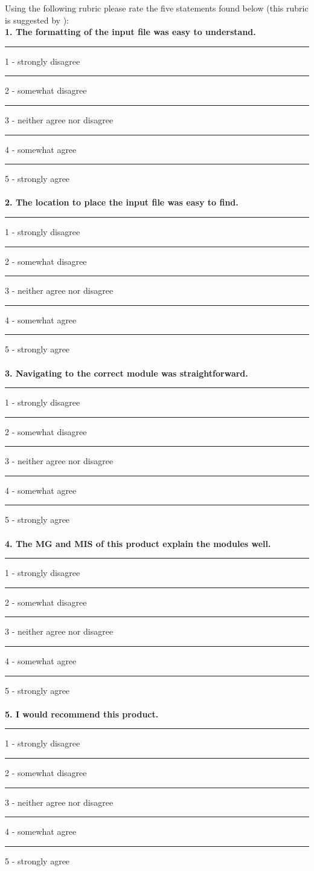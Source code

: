 \documentclass[12pt, titlepage]{article}
\begin{document}
Using the following rubric please rate the five statements found below (this rubric is suggested by \cite{LatticeB41:online}):\\
\textbf{1. The formatting of the input file was easy to understand.} \\
\rule{2cm}{0pt}1 - strongly disagree\\
\rule{2cm}{0pt}2 - somewhat disagree\\
\rule{2cm}{0pt}3 - neither agree nor disagree\\
\rule{2cm}{0pt}4 - somewhat agree\\
\rule{2cm}{0pt}5 - strongly agree\\ 
\\
\textbf{2. The location to place the input file was easy to find.}\\
\rule{2cm}{0pt}1 - strongly disagree\\
\rule{2cm}{0pt}2 - somewhat disagree\\
\rule{2cm}{0pt}3 - neither agree nor disagree\\
\rule{2cm}{0pt}4 - somewhat agree\\
\rule{2cm}{0pt}5 - strongly agree\\ 
\\
\textbf{3. Navigating to the correct module was straightforward.}\\
\rule{2cm}{0pt}1 - strongly disagree\\
\rule{2cm}{0pt}2 - somewhat disagree\\
\rule{2cm}{0pt}3 - neither agree nor disagree\\
\rule{2cm}{0pt}4 - somewhat agree\\
\rule{2cm}{0pt}5 - strongly agree\\
\\
\textbf{4. The MG and MIS of this product explain the modules well.}\\
\rule{2cm}{0pt}1 - strongly disagree\\
\rule{2cm}{0pt}2 - somewhat disagree\\
\rule{2cm}{0pt}3 - neither agree nor disagree\\
\rule{2cm}{0pt}4 - somewhat agree\\
\rule{2cm}{0pt}5 - strongly agree\\
\\
\textbf{5. I would recommend this product.}\\
\rule{2cm}{0pt}1 - strongly disagree\\
\rule{2cm}{0pt}2 - somewhat disagree\\
\rule{2cm}{0pt}3 - neither agree nor disagree\\
\rule{2cm}{0pt}4 - somewhat agree\\
\rule{2cm}{0pt}5 - strongly agree\\
\end{document}

